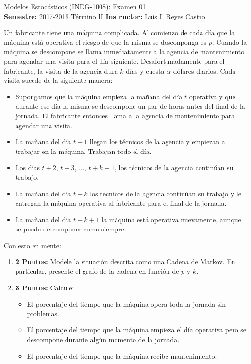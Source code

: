 \documentclass[ a4paper, twoside, 11pt]{article}
\newcommand{\numero}{01}
\begin{document}
\allowdisplaybreaks



\begin{center}
\Large Modelos Estoc\'asticos (INDG-1008): Examen \numero \\[2ex]
\small \textbf{Semestre:} 2017-2018 T\'ermino II \qquad
\textbf{Instructor:} Luis I. Reyes Castro
\end{center}
\fullskip

\begin{problem}
\label{prob:maquina-caprichosa}
Un fabricante tiene una m\'aquina complicada. Al comienzo de cada d\'ia que la m\'aquina est\'a operativa el riesgo de que la misma se desconponga es $p$. Cuando la m\'aquina se descompone se llama inmediatamente a la agencia de mantenimiento para agendar una visita para el d\'ia siguiente. Desafortunadamente para el fabricante, la visita de la agencia dura \linebreak $k$ d\'ias y cuesta $\alpha$ d\'olares diarios. Cada visita sucede de la siguiente manera: 
\begin{itemize}
\item Supongamos que la m\'aquina empieza la ma\~nana del d\'ia $t$ operativa y que durante ese d\'ia la misma se descompone un par de horas antes del final de la jornada. El fabricante entonces llama a la agencia de mantenimiento para agendar una visita. 
\item La ma\~nana del d\'ia $t+1$ llegan los t\'ecnicos de la agencia y empiezan a trabajar en la m\'aquina. Trabajan todo el d\'ia. 
\item Los d\'ias $t+2$, $t+3$, $\dots$, $t+k-1$, los t\'ecnicos de la agencia contin\'uan su trabajo. 
\item La ma\~nana del d\'ia $t+k$ los t\'ecnicos de la agencia contin\'uan su trabajo y le entregan la m\'aquina operativa al fabricante para el final de la jornada. 
\item La ma\~nana del d\'ia $t+k+1$ la m\'aquina est\'a operativa nuevamente, aunque se puede descomponer como siempre. 
\end{itemize}

Con esto en mente: 
\begin{enumerate}[label=\textbf{\alph*)}]
\item \textbf{2 Puntos:} Modele la situaci\'on descrita como una Cadena de Markov. En particular, presente el grafo de la cadena en funci\'on de $p$ y $k$. 
\item \textbf{3 Puntos:} Calcule: 
\begin{itemize}
\item El porcentaje del tiempo que la m\'aquina opera toda la jornada sin problemas. 
\item El porcentaje del tiempo que la m\'aquina empieza el d\'ia operativa pero se descompone durante alg\'un momento de la jornada. 
\item El porcentaje del tiempo que la m\'aquina recibe mantenimiento. 
\end{itemize}
\end{enumerate}

\end{problem}
\fullskip
\end{document}
